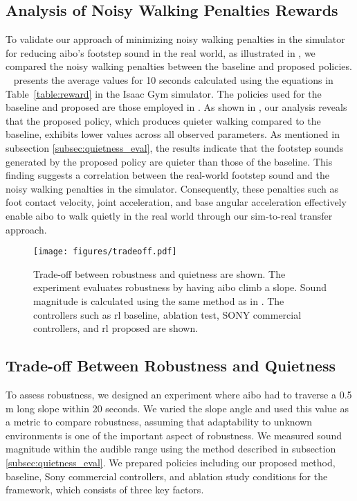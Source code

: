 \subsection{Analysis of Noisy Walking Penalties Rewards}
To validate our approach of minimizing noisy walking penalties in the simulator for reducing aibo's footstep sound in the real world, as illustrated in , we compared the noisy walking penalties between the baseline and proposed policies. 
~ presents the average values for 10 seconds calculated using the equations in Table~\ref{table:reward} in the Isaac Gym simulator.
The policies used for the baseline and proposed are those employed in . 
As shown in , our analysis reveals that the proposed policy, which produces quieter walking compared to the baseline, exhibits lower values across all observed parameters. As mentioned in subsection \ref{subsec:quietness_eval}, the results indicate that the footstep sounds generated by the proposed policy are quieter than those of the baseline.
This finding suggests a correlation between the real-world footstep sound and the noisy walking penalties in the simulator. Consequently, these penalties such as foot contact velocity, joint acceleration, and base angular acceleration effectively enable aibo to walk quietly in the real world through our sim-to-real transfer approach.

\begin{figure}
    \centering
    \texttt{[image: figures/tradeoff.pdf]}
    \caption{Trade-off between robustness and quietness are shown. The experiment evaluates robustness by having aibo climb a slope. Sound magnitude is calculated using the same method as in . The controllers such as \ac{rl} baseline, ablation test, SONY commercial controllers, and \ac{rl} proposed are shown.}
    \label{fig:tradeoff}
    \vspace{-2ex}
\end{figure}

\subsection{Trade-off Between Robustness and Quietness}
To assess robustness, we designed an experiment where aibo had to traverse a 0.5 m long slope within 20 seconds. We varied the slope angle and used this value as a metric to compare robustness, assuming that adaptability to unknown environments is one of the important aspect of robustness. We measured sound magnitude within the audible range using the method described in subsection \ref{subsec:quietness_eval}. We prepared policies including our proposed method, baseline, Sony commercial controllers, and ablation study conditions for the framework, which consists of three key factors.

